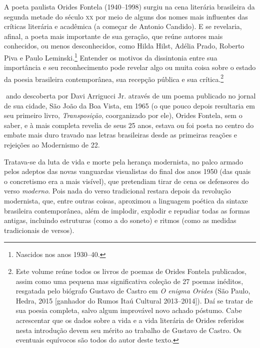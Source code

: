 
A poeta paulista Orides Fontela (1940--1998) surgiu na cena literária
brasileira da segunda metade do século \textsc{xx} por meio de alguns dos nomes
mais inﬂuentes das críticas literária e acadêmica (a começar de Antonio
Candido). E se revelaria, aﬁnal, a poeta mais importante de sua geração,
que reúne autores mais conhecidos, ou menos desconhecidos, como Hilda
Hilst, Adélia Prado, Roberto Piva e Paulo Leminski.\footnote{Nascidos nos anos 1930--40.} Entender os motivos
da dissintonia entre sua importância e seu reconhecimento pode revelar
algo ou muita coisa sobre o estado da poesia brasileira contemporânea,
sua recepção pública e sua crítica.\footnote{Este volume reúne todos os livros de poemas de Orides Fontela
publicados, assim como uma pequena mas signiﬁcativa coleção de 27 poemas
inéditos, resgatada pelo biógrafo Gustavo de Castro em \emph{O enigma
Orides} (São Paulo, Hedra, 2015 {[}ganhador do Rumos Itaú Cultural
2013--2014{]}). Daí se tratar de sua poesia completa, salvo algum
improvável novo achado póstumo. Cabe acrescentar que os dados sobre a
vida e a vida literária de Orides referidos nesta introdução devem seu
mérito ao trabalho de Gustavo de Castro. Os eventuais equívocos são
todos do autor deste texto.}

ando descoberta por Davi Arrigucci Jr. através de um poema publicado
no jornal de sua cidade, São João da Boa Vista, em 1965 (o que pouco
depois resultaria em seu primeiro livro, \emph{Transposição},
coorganizado por ele), Orides Fontela, sem o saber, e à mais completa
revelia de seus 25 anos, estava ou foi posta no centro do embate mais
duro travado nas letras brasileiras desde as primeiras reações e
rejeições ao Modernismo de 22.

Tratava-se da luta de vida e morte pela herança modernista, no palco
armado pelos adeptos das novas vanguardas visualistas do ﬁnal dos anos
1950 (das quais o concretismo era a mais visível), que pretendiam tirar
de cena os defensores do verso \emph{moderno}. Pois nada do verso
tradicional restara depois da revolução modernista, que, entre outras
coisas, aproximou a linguagem poética da sintaxe brasileira
contemporânea, além de implodir, explodir e repudiar todas as formas
antigas, incluindo estruturas (como a do soneto) e ritmos (como as
medidas tradicionais de versos).

